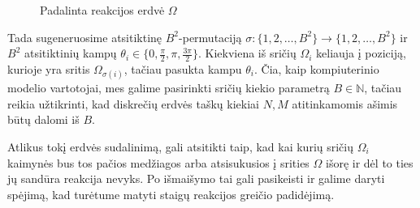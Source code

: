 \begin{figure}[!h]
\centering
\caption{Padalinta reakcijos erdvė $\Omega$}
\label{split-reaction-space}

\end{figure}

Tada sugeneruosime atsitiktinę $B^2$-permutaciją $\sigma: \{ 1, 2, \dots, B^2 \} \to \{ 1, 2, \dots, B^2 \} $ ir $B^2$ atsitiktinių kampų $\theta_i \in \{0, \frac{\pi}{2}, \pi, \frac{3\pi}{2}\}$. Kiekviena iš sričių $\Omega_i$ keliauja į poziciją, kurioje yra sritis $\Omega_{\sigma(i)}$, tačiau pasukta kampu $\theta_i$. Čia, kaip kompiuterinio modelio vartotojai, mes galime pasirinkti sričių kiekio parametrą $B\in\mathbb{N}$, tačiau reikia užtikrinti, kad diskrečių erdvės taškų kiekiai $N, M$ atitinkamomis ašimis būtų dalomi iš $B$. 

Atlikus tokį erdvės sudalinimą, gali atsitikti taip, kad kai kurių sričių $\Omega_i$ kaimynės bus tos pačios medžiagos arba atsisukusios į srities $\Omega$ išorę ir dėl to ties jų sandūra reakcija nevyks. Po išmaišymo tai gali pasikeisti ir galime daryti spėjimą, kad turėtume matyti staigų reakcijos greičio padidėjimą. 






